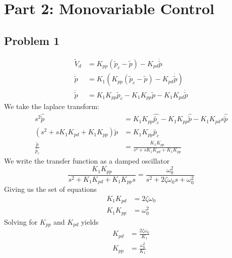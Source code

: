 \section{Part 2: Monovariable Control}

\subsection{Problem 1}

\begin{subequations}
		\begin{align}
		\tilde V_d &= K_{pp} (\tilde p_c - \tilde p) - K_{pd} \dot {\tilde {p}}\\
		\ddot {\tilde p} &= K_1 (K_{pp} (\tilde p_c - \tilde p) - K_{pd} \dot {\tilde {p}})\\
		\ddot {\tilde p} &= K_1 K_{pp} \tilde p_c - K_1 K_{pp} \tilde p - K_1 K_{pd} \dot {\tilde p}
		\end{align}	
\end{subequations}
We take the laplace transform:
\begin{subequations}
		\begin{align}
		s^2 \hat{\tilde{p}} &= K_1 K_{pp} \hat{\tilde {p_c}} - K_1 K_{pp} \hat{\tilde p} - K_1 K_{pd} s \hat {\tilde p} \\
		(s^2 + s K_1 K_{pd} + K_1 K_{pp})\tilde{p} &= K_1 K_{pp} \tilde{p_c} \\
		\frac{\tilde{p}}{\tilde {p_c}} &= \frac{K_1 K_{pp}}{s^2 + s K_1 K_{pd} + K_1 K_{pp}}
		\end{align}
\end{subequations}
We write the transfer function as a damped oscillator
\begin{equation}
	\frac{K_1 K_{pp}}{s^2 + K_1 K_{pd} + K_1 K_{pp} s} = \frac{\omega _0 ^2}{s^2 + 2\zeta \omega_0 s + \omega _0 ^2}
\end{equation}
Giving us the set of equations
\begin{subequations}
		\begin{align}
		K_1 K_{pd}  &= 2\zeta \omega_0 \\
		K_1 K_{pp}  &= \omega _0 ^2
		\end{align}
\end{subequations}
Solving for $K_{pp}$ and $K_{pd}$ yields
\begin{subequations}
		\begin{align}
		K_{pd}  &= \frac{2\zeta \omega_0}{K_1} \label{eq:k1}\\
		K_{pp}  &= \frac{\omega _0 ^2}{K_1} \label{eq:k2}
		\end{align}
\end{subequations}

